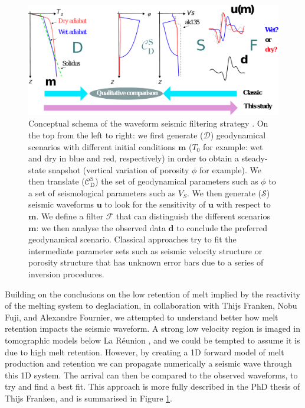 \begin{figure}
\centering
\includegraphics[width=\textwidth]{figures/ch2-schema.pdf}
\caption{Conceptual schema of the waveform seismic filtering strategy \citep[see][]{franken-etal-2020}. On the top from the left to right: we first generate ($\mathcal{D}$)  geodynamical scenarios with different initial conditions $\mathbf{m}$ ($T_0$ for example: wet and dry in blue and red, respectively) in order to obtain a steady-state snapshot (vertical variation of porosity $\phi$ for example). We then translate  ($\mathcal{C}_\mathrm{D}^\mathrm{S}$) the set of geodynamical parameters such as $\phi$ to a set of seismological parameters such as $V_S$. We then generate ($\mathcal{S}$) seismic waveforms $\mathbf{u}$ to look for the sensitivity of $\mathbf{u}$ with respect to $\mathbf{m}$. We define a filter $\mathcal{F}$ that can distinguish the different scenarios $\mathbf{m}$: we then analyse the observed data $\mathbf{d}$ to conclude the preferred geodynamical scenario. Classical approaches try to fit the intermediate parameter sets such as seismic velocity structure or porosity structure that has unknown error bars due to a series of inversion procedures.}
\label{fg:inversion}
\end{figure}

Building on the conclusions on the low retention of melt implied by the reactivity of the melting system to deglaciation, in collaboration with Thijs Franken, Nobu Fuji, and Alexandre Fournier, we attempted to understand better how melt retention impacts the seismic waveform. A strong low velocity region is imaged in tomographic models below La Réunion \citep{mazzullo-etal-2017}, and we could be tempted to assume it is due to high melt retention. However, by creating a 1D forward model of melt production and retention we can propagate numerically a seismic wave through this 1D system. The arrival can then be compared to the observed waveforms, to try and find a best fit. This approach is more fully described in the PhD thesis of Thijs Franken, and is summarised in Figure \ref{fg:inversion}.

